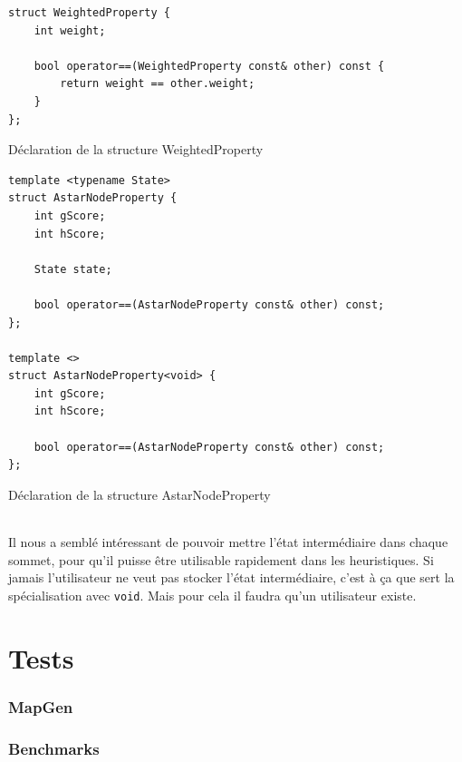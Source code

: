 \documentclass[french]{article}
\begin{document}
\begin{listing}[H]
\begin{verbatim}
struct WeightedProperty {
	int weight;

	bool operator==(WeightedProperty const& other) const {
		return weight == other.weight;
	}
};
\end{verbatim}
\caption{Déclaration de la structure WeightedProperty}
\label{tsp:weightedprop}
\end{listing}

\begin{listing}[H]
\begin{verbatim}
template <typename State>
struct AstarNodeProperty {
	int gScore;
	int hScore;

	State state;

	bool operator==(AstarNodeProperty const& other) const;
};

template <>
struct AstarNodeProperty<void> {
	int gScore;
	int hScore;

	bool operator==(AstarNodeProperty const& other) const;
};
\end{verbatim}
\caption{Déclaration de la structure AstarNodeProperty}
\label{tsp:astarnodeprop}
\end{listing}

\paragraph{} Il nous a semblé intéressant de pouvoir mettre l'état
intermédiaire dans chaque sommet, pour qu'il puisse être utilisable rapidement
dans les heuristiques. Si jamais l'utilisateur ne veut pas stocker l'état
intermédiaire, c'est à ça que sert la spécialisation avec
\texttt{void}. Mais pour cela il faudra qu'un utilisateur existe.

\part{Tests}

\section{MapGen}

\section{Benchmarks}
\end{document}
